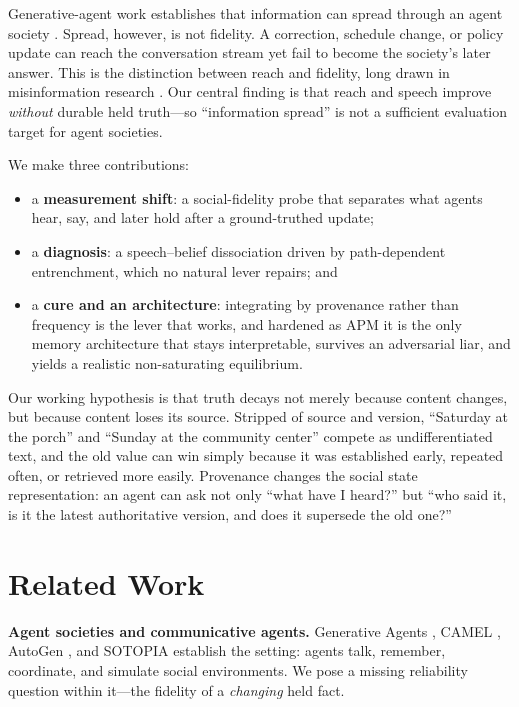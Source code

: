 \documentclass[letterpaper]{article} %
\begin{document}
Generative-agent work establishes that information can spread through an agent society
\citep{park2023generative,li2023camel,wu2023autogen,zhou2024sotopia}. Spread, however, is not
fidelity. A correction, schedule change, or policy update can reach the conversation stream yet
fail to become the society's later answer. This is the distinction between reach and fidelity,
long drawn in misinformation research \citep{lazer2018science,vosoughi2018spread}. Our central
finding is that reach and speech improve \emph{without} durable held truth---so ``information
spread'' is not a sufficient evaluation target for agent societies.

\noindent We make three contributions:
\begin{itemize}
\item a \textbf{measurement shift}: a social-fidelity probe that separates what agents hear,
  say, and later hold after a ground-truthed update;
\item a \textbf{diagnosis}: a speech--belief dissociation driven by path-dependent
  entrenchment, which no natural lever repairs; and
\item a \textbf{cure and an architecture}: integrating by provenance rather than frequency is
  the lever that works, and hardened as APM it is the only memory architecture that stays
  interpretable, survives an adversarial liar, and yields a realistic non-saturating
  equilibrium.
\end{itemize}

Our working hypothesis is that truth decays not merely because content changes, but because
content loses its source. Stripped of source and version, ``Saturday at the porch'' and
``Sunday at the community center'' compete as undifferentiated text, and the old value can win
simply because it was established early, repeated often, or retrieved more easily. Provenance
changes the social state representation: an agent can ask not only ``what have I heard?'' but
``who said it, is it the latest authoritative version, and does it supersede the old one?''

\section{Related Work}
\textbf{Agent societies and communicative agents.} Generative Agents
\citep{park2023generative}, CAMEL \citep{li2023camel}, AutoGen \citep{wu2023autogen}, and
SOTOPIA \citep{zhou2024sotopia} establish the setting: agents talk, remember, coordinate, and
simulate social environments. We pose a missing reliability question within it---the fidelity
of a \emph{changing} held fact.
\end{document}
